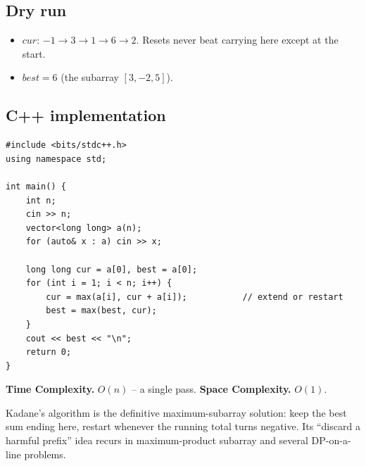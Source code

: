 \subsection*{Dry run}


\begin{itemize}
  \item $\textit{cur}$: $-1\to3\to1\to6\to2$. Resets never beat carrying
        here except at the start.
  \item $\textit{best}=6$ (the subarray $[3,-2,5]$).
\end{itemize}

\subsection*{C++ implementation}

\begin{lstlisting}
#include <bits/stdc++.h>
using namespace std;

int main() {
    int n;
    cin >> n;
    vector<long long> a(n);
    for (auto& x : a) cin >> x;

    long long cur = a[0], best = a[0];
    for (int i = 1; i < n; i++) {
        cur = max(a[i], cur + a[i]);           // extend or restart
        best = max(best, cur);
    }
    cout << best << "\n";
    return 0;
}
\end{lstlisting}

\begin{complexitybox}
\textbf{Time Complexity.} $O(n)$ -- a single pass. \textbf{Space
Complexity.} $O(1)$.
\end{complexitybox}

\begin{takeawaybox}
Kadane's algorithm is the definitive maximum-subarray solution: keep the
best sum ending here, restart whenever the running total turns negative. Its
``discard a harmful prefix'' idea recurs in maximum-product subarray and
several DP-on-a-line problems.
\end{takeawaybox}

